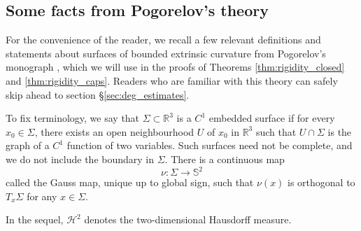 \documentclass[12pt]{article}
\newcommand{\R}{\mathbb{R}}
\theoremstyle{plain}
\numberwithin{equation}{section}
\begin{document}
\subsection{Some facts from Pogorelov's theory} \label{sec:pogorelov}
For the convenience of the reader, we recall a few relevant definitions and statements about surfaces of bounded extrinsic curvature from Pogorelov's monograph \cite{pogorelov_73}, which we will use in the proofs of Theorems \ref{thm:rigidity_closed} and \ref{thm:rigidity_caps}. Readers who are familiar with this theory can safely skip ahead to section \S \ref{sec:deg_estimates}.

To fix terminology, we say that $\Sigma \subset \R^3$ is a $C^1$ embedded surface if for every $x_0 \in \Sigma$, there exists an open neighbourhood $U$ of $x_0$ in $\R^3$ such that $U \cap \Sigma$ is the graph of a $C^1$ function of two variables. Such surfaces need not be complete, and we do not include the boundary in $\Sigma$. There is a continuous map
\begin{equation}
    \nu : \Sigma \to \mathbb{S}^2
\end{equation}
called the Gauss map, unique up to global sign, such that $\nu(x)$ is orthogonal to $T_x\Sigma$ for any $x \in \Sigma$.

In the sequel, $\mathcal{H}^2$ denotes the two-dimensional Hausdorff measure.
\end{document}
